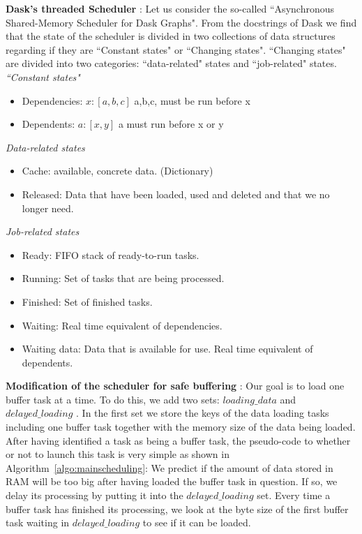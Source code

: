 \documentclass[conference]{IEEEtran}
\begin{document}
\textbf{Dask's threaded Scheduler} :
Let us consider the so-called ``Asynchronous Shared-Memory Scheduler for Dask Graphs". From the docstrings of Dask we find that the state of the scheduler is divided in two collections of data structures regarding if they are ``Constant states" or ``Changing states". ``Changing states" are divided into two categories: ``data-related" states and ``job-related" states. \\

\noindent \textit{``Constant states"}
\begin{itemize}
  \item Dependencies: ${x: [a, b ,c]}$ a,b,c, must be run before x
  \item Dependents: ${a: [x, y]}$ a must run before x or y
\end{itemize}

\noindent \textit{Data-related states}
\begin{itemize}
  \item Cache: available, concrete data. (Dictionary)
  \item Released: Data that have been loaded, used and deleted and that we no longer need.
\end{itemize}

\noindent \textit{Job-related states}
\begin{itemize}
  \item Ready: FIFO stack of ready-to-run tasks.
  \item Running: Set of tasks that are being processed.
  \item Finished: Set of finished tasks.
  \item Waiting: Real time equivalent of dependencies.
  \item Waiting data: Data that is available for use. Real time equivalent of dependents.
\end{itemize}


\textbf{Modification of the scheduler for safe buffering} :
Our goal is to load one buffer task at a time. To do this, we add two sets: $loading\_data$ and $delayed\_loading$ . In the first set we store the keys of the data loading tasks including one buffer task together with the memory size of the data being loaded. After having identified a task as being a buffer task, the pseudo-code to whether or not to launch this task is very simple as shown in Algorithm~\ref{algo:mainscheduling}: We predict if the amount of data stored in RAM will be too big after having loaded the buffer task in question. If so, we delay its processing by putting it into the $delayed\_loading$ set. Every time a buffer task has finished its processing, we look at the byte size of the first buffer task waiting in $delayed\_loading$ to see if it can be loaded.
\end{document}
